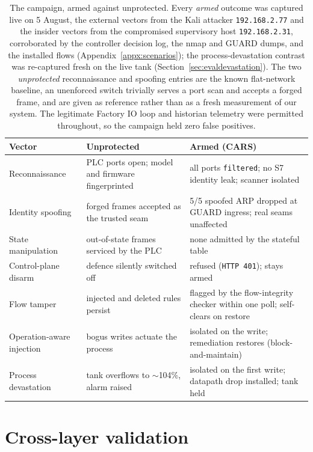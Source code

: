 \begin{table}[t]
\centering
\small
\begin{tabular}{p{}p{}p{}}
\hline
Vector & Unprotected & Armed (CARS) \\
\hline
Reconnaissance & PLC ports open; model and firmware fingerprinted & all ports \texttt{filtered}; no S7 identity leak; scanner isolated \\
Identity spoofing & forged frames accepted as the trusted seam & 5/5 spoofed ARP dropped at GUARD ingress; real seams unaffected \\
State manipulation & out-of-state frames serviced by the PLC & none admitted by the stateful table \\
Control-plane disarm & defence silently switched off & refused (\texttt{HTTP 401}); stays armed \\
Flow tamper & injected and deleted rules persist & flagged by the flow-integrity checker within one poll; self-clears on restore \\
Operation-aware injection & bogus writes actuate the process & isolated on the write; remediation restores (block-and-maintain) \\
Process devastation & tank overflows to $\sim$104\%, alarm raised & isolated on the first write; datapath drop installed; tank held \\
\hline
\end{tabular}
\caption[The campaign: armed versus unprotected]{The campaign, armed against unprotected. Every \emph{armed} outcome was captured live on 5 August, the external vectors from the Kali attacker \texttt{192.168.2.77} and the insider vectors from the compromised supervisory host \texttt{192.168.2.31}, corroborated by the controller decision log, the nmap and GUARD dumps, and the installed flows (Appendix~\ref{appx:scenarios}); the process-devastation contrast was re-captured fresh on the live tank (Section~\ref{sec:evaldevastation}). The two \emph{unprotected} reconnaissance and spoofing entries are the known flat-network baseline, an unenforced switch trivially serves a port scan and accepts a forged frame, and are given as reference rather than as a fresh measurement of our system. The legitimate Factory IO loop and historian telemetry were permitted throughout, so the campaign held zero false positives.}
\label{tab:campaign}
\end{table}

\section{Cross-layer validation}
\label{sec:evalcrosslayer}

